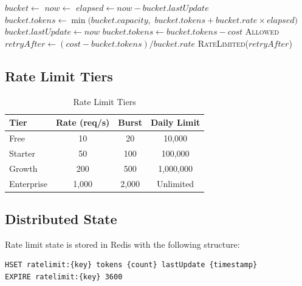 \documentclass[11pt,a4paper]{article}
\begin{document}
\begin{algorithm}
\caption{Distributed Token Bucket}
\begin{algorithmic}[1]
    \State $bucket \gets$ 
    \State $now \gets$ 
    \State {}
    \State $elapsed \gets now - bucket.lastUpdate$
    \State $bucket.tokens \gets \min(bucket.capacity,$
    \State \hspace{4em} $bucket.tokens + bucket.rate \times elapsed)$
    \State $bucket.lastUpdate \gets now$
        \State $bucket.tokens \gets bucket.tokens - cost$
        \State {}
        \State \Return \textsc{Allowed}
    \Else
        \State $retryAfter \gets (cost - bucket.tokens) / bucket.rate$
        \State \Return \textsc{RateLimited}($retryAfter$)
    \EndIf
\EndFunction
\end{algorithmic}
\end{algorithm}

\subsection{Rate Limit Tiers}

\begin{table}[h]
\centering
\caption{Rate Limit Tiers}
\begin{tabular}{lccc}
\toprule
\textbf{Tier} & \textbf{Rate (req/s)} & \textbf{Burst} & \textbf{Daily Limit} \\
\midrule
Free & 10 & 20 & 10,000 \\
Starter & 50 & 100 & 100,000 \\
Growth & 200 & 500 & 1,000,000 \\
Enterprise & 1,000 & 2,000 & Unlimited \\
\bottomrule
\end{tabular}
\end{table}

\subsection{Distributed State}

Rate limit state is stored in Redis with the following structure:

\begin{lstlisting}[caption=Redis Rate Limit State]
HSET ratelimit:{key} tokens {count} lastUpdate {timestamp}
EXPIRE ratelimit:{key} 3600
\end{lstlisting}
\end{document}
